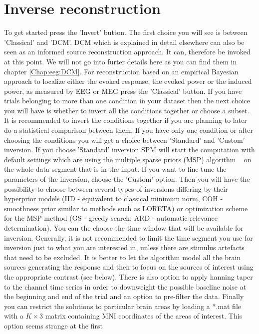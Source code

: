 \section{Inverse reconstruction}
To get started press the 'Invert' button. The first
choice you will see is between 'Classical' and 'DCM'. DCM which is explained in detail elsewhere can also be seen as an 
informed source reconstruction approach. It can, therefore be invoked at this point. We will not go into furter details here as you
can find them in chapter \ref{Chap:eeg:DCM}. For reconstruction based on an empirical Bayesian approach to localize either the evoked response, 
the evoked power or the induced power, as measured by EEG or MEG press the 'Classical' button. If you have trials belonging to more than one condition
in your dataset then the next choice you will have is whether to invert all the conditions together or choose a subset. It is recommended to invert
the conditions together if you are planning to later do a statistical comparison between them. If you have only one condition or after choosing
the conditions you will get a choice between 'Standard' and 'Custom' inversion. If you choose 'Standard' inversion SPM will start the computation
with default settings which are using the multiple sparse priors (MSP) algorithm ~\cite{karl_msp} on the whole data segment that is in the input.
If you want to fine-tune the parameters of the inversion, choose the 'Custom' option.
Then you will have the possibility to choose between several types of inversions differing by their hyperprior models (IID - equivalent to classical
minimum norm, COH - smoothness prior similar to methods such as LORETA) or optimization scheme for the MSP method (GS - greedy search, ARD - automatic
relevance determination). You can the choose the time window that will be available for inversion. Generally, it is not recommended to limit the time
segment you use for inversion just to what you are interested in, unless there are stimulus artefacts
that need to be excluded. It is better to let the algorithm model all the brain sources generating the response and then to focus on the sources
of interest using the appropriate contrast (see below). There is also option to apply hanning taper to the channel time series in order to downweight
the possible baseline noise at the beginning and end of the trial and an option to pre-filter the data. Finally you can restrict the solutions to particular
brain areas by loading a *.mat file with a $K \times 3$ matrix containing MNI coordinates of the areas of interest. This option seems strange at the first
